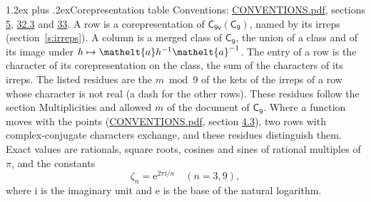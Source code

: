 \documentclass[10pt,a4paper]{article}
\makeatletter
\renewcommand\section{\@startsection{section}{1}{\z@}{-3ex plus -1ex minus -.2ex}%
  {1.2ex plus .2ex}{\normalfont\large\sffamily\bfseries\color{parttitle}}}
\numberwithin{equation}{section}
\newcommand{\eltfont}[1]{{\let\sigma\eltsigma\mathelt{#1}}}
\newcommand{\grp}[1]{\mathsf{#1}}
\newcommand{\elt}[1]{\eltfont{#1}}
\newcommand{\iunit}{\mathrm{i}}
\newcommand{\expe}{\mathrm{e}}
\newcommand{\rootunity}[1]{\zeta_{#1}}
\makeatother
\begin{document}
\section{Corepresentation table}\label{s:character_table}
Conventions: \href{../../CONVENTIONS.pdf}{CONVENTIONS.pdf}, sections \href{../../../rotation/CONVENTIONS.pdf\#conv.5}{5}, \href{../../CONVENTIONS.pdf\#conv.32.3}{32.3} and \href{../../CONVENTIONS.pdf\#conv.33}{33}.
A row is a corepresentation of $\grp{C_{9v}}(\grp{C_{9}})$, named by its irreps (section~\ref{s:irreps}). A column is a merged class of $\grp{C_{9}}$, the union of a class and of its image under $h \mapsto \elt{a} h^{-1} \elt{a}^{-1}$. The entry of a row is the character of its corepresentation on the class, the sum of the characters of its irreps.
\leavevmode\label{n:head.parity}The listed residues are the $m \bmod 9$ of the kets of the irreps of a row whose character is not real (a dash for the other rows). These residues follow the section Multiplicities and allowed $m$ of the document of \href{../../../rotation/data/pdf/C9.pdf}{$\grp{C_{9}}$}. Where a function moves with the points (\href{../../CONVENTIONS.pdf}{CONVENTIONS.pdf}, section \href{../../../rotation/CONVENTIONS.pdf\#conv.4.3}{4.3}), two rows with complex-conjugate characters exchange, and these residues distinguish them.
\leavevmode\label{n:constant.root}\label{n:index.root.order}Exact values are rationals, square roots, cosines and sines of rational multiples of $\pi$, and the constants
\begin{equation}\label{e:constants}\rootunity{n} = \expe^{2\pi\iunit/n}\quad(n = 3, 9),\end{equation}
where $\iunit$ is the imaginary unit and $\expe$ is the base of the natural logarithm.
\end{document}
